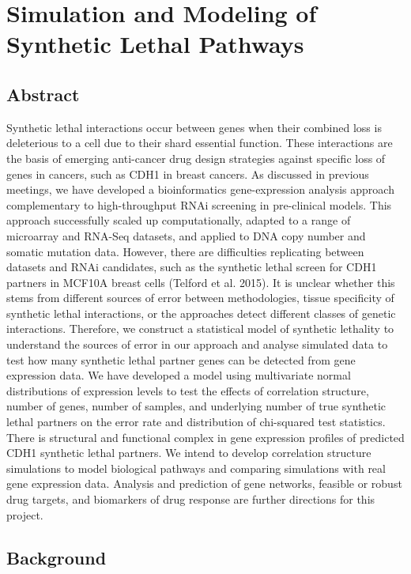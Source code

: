 \chapter{Simulation and Modeling of Synthetic Lethal Pathways}
\label{chap:simulation}

\section{Abstract}

Synthetic lethal interactions occur between genes when their combined loss is deleterious to a cell due to their shard essential function.   These interactions are the basis of emerging anti-cancer drug design strategies against specific loss of genes in cancers, such as CDH1 in breast cancers.   As discussed in previous meetings, we have developed a bioinformatics gene-expression analysis approach complementary to high-throughput RNAi screening in pre-clinical models.   This approach successfully scaled up computationally, adapted to a range of microarray and RNA-Seq datasets, and applied to DNA copy number and somatic mutation data.   However, there are difficulties replicating between datasets and RNAi candidates, such as the synthetic lethal screen for CDH1 partners in MCF10A breast cells (Telford et al. 2015).   It is unclear whether this stems from different sources of error between methodologies, tissue specificity of synthetic lethal interactions, or the approaches detect different classes of genetic interactions.   Therefore, we construct a statistical model of synthetic lethality to understand the sources of error in our approach and analyse simulated data to test how many synthetic lethal partner genes can be detected from gene expression data.   We have developed a model using multivariate normal distributions of expression levels to test the effects of correlation structure, number of genes, number of samples, and underlying number of true synthetic lethal partners on the error rate and distribution of chi-squared test statistics.   There is structural and functional complex in gene expression profiles of predicted CDH1 synthetic lethal partners.   We intend to develop correlation structure simulations to model biological pathways and comparing simulations with real gene expression data.   Analysis and prediction of gene networks, feasible or robust drug targets, and biomarkers of drug response are further directions for this project.

\section{Background}

